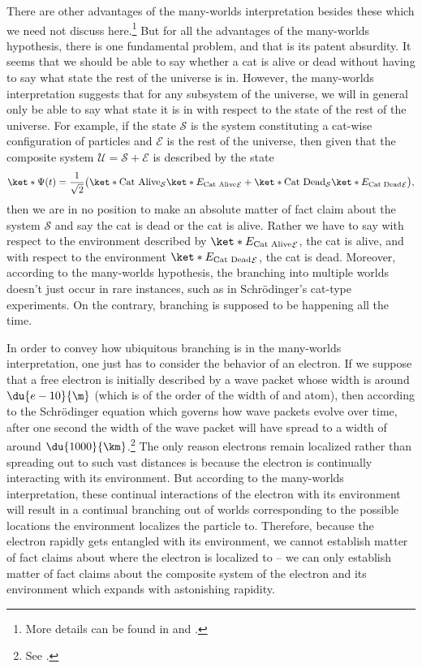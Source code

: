 \documentclass[12pt]{report}
\providecommand{\DIFaddbegin}{} %
\providecommand{\DIFaddend}{} %
\begin{document}
       There are other advantages  of the many-worlds interpretation besides these which we need not discuss here.\footnote{More details can be found in \cite{Schlosshauer} and \cite{joos2013decoherence}.} But for all the advantages of the many-worlds hypothesis, there is one fundamental problem, and that is its patent absurdity. It seems that we should be able to say whether a cat is alive or dead without having to say what state the rest of the universe is in. However, the many-worlds interpretation suggests that for any subsystem of the universe, we will in general only be able to say what state it is in with respect to the state of the rest of the universe. For example, if the state $\mathcal{S}$ is the system constituting a cat-wise configuration of particles and $\mathcal{E}$ is the rest of the universe, then given that the composite system $\mathcal{U}=\mathcal{S}+\mathcal{E}$ is described by the state $$\ket*{\Psi(t)}=\frac{1}{\sqrt{2}}\big(\ket*{\text{Cat Alive}}_\mathcal{S}\ket*{E_\text{Cat Alive}}_\mathcal{E}+\ket*{\text{Cat Dead}}_\mathcal{S}\ket*{E_\text{Cat Dead}}_\mathcal{E}\big),$$ then we are in no position to make an absolute matter of fact claim about the system $\mathcal{S}$ and say the cat is dead or the cat is alive. Rather we have to say with respect to the environment described by $\ket*{E_\text{Cat Alive}}_\mathcal{E}$, the cat is alive, and with respect to the environment $\ket*{E_\text{Cat Dead}}_\mathcal{E}$, the cat is dead. Moreover, according to the many-worlds hypothesis, the branching into multiple worlds doesn't just occur in rare instances, such as in Schr\"{o}dinger's cat-type experiments. On the contrary, branching is supposed to be happening all the time.  

       In order to convey how ubiquitous branching is in the many-worlds interpretation, one just has to consider the behavior of an electron. If we suppose that a free electron \DIFaddbegin \label{electronspread} \DIFaddend is initially described by a wave packet whose width is around $\du{e-10}{\m}$  (which is of the order of the width of and atom), then according to the Schr\"{o}dinger equation which governs how wave packets evolve over time, after one second the width of the wave packet will have spread to a width of around $\du{1000}{\km}$.\footnote{See \cite[117]{Schlosshauer}.} The only reason electrons remain localized rather than spreading out to such vast distances is because the electron is continually interacting with its environment.  But according to the many-worlds interpretation, these continual interactions of the electron with its environment will result in a continual branching out of worlds corresponding to the possible locations the environment localizes the particle to. Therefore, because the electron rapidly gets entangled with its environment, we cannot establish matter of fact claims about where the electron is localized to -- we can only establish matter of fact claims about the composite system of the electron and its environment which expands with astonishing rapidity.     
\end{document}
